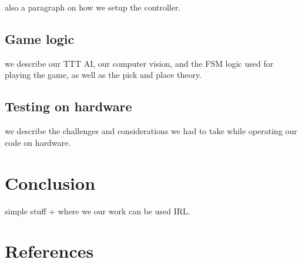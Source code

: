 \documentclass{article}
\begin{document}
also a paragraph on how we setup the controller.

\subsection{Game logic}

we describe our TTT AI, our computer vision, and the FSM logic used for playing the game, as well as the pick and place theory.

\subsection{Testing on hardware}

we describe the challenges and considerations we had to take while operating our code on hardware.

\section{Conclusion}

simple stuff + where we our work can be used IRL.

\section{References}

\printbibliography
\end{document}
